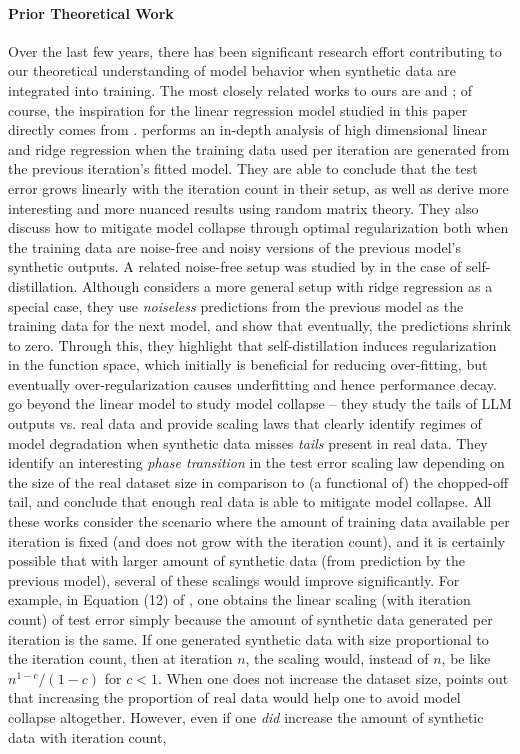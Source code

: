 \paragraph{Prior Theoretical Work} Over the last few years, there has been significant research effort contributing to our theoretical understanding of model behavior when synthetic data are integrated into training. The most closely related works to ours are \citet{dohmatob2024model} and \citet{dohmatob2024tale}; of course, the inspiration for the linear regression model studied in this paper directly comes from \citet{dohmatob2024model}. \citet{dohmatob2024model} performs an in-depth analysis of high dimensional linear and ridge regression when the training data used per iteration are generated from the previous iteration's fitted model. They are able to conclude that the test error grows linearly with the iteration count in their setup, as well as derive more interesting and more nuanced results using random matrix theory. They also discuss how to mitigate model collapse through optimal regularization both when the training data are noise-free and noisy versions of the previous model's synthetic outputs. A related noise-free setup was studied by \citet{mobahi2020self} in the case of self-distillation. Although \cite{mobahi2020self} considers a more general setup with ridge regression as a special case, they use \textit{noiseless} predictions from the previous model as the training data for the next model, and show that eventually, the predictions shrink to zero. Through this, they highlight that self-distillation induces regularization in the function space, which initially is beneficial for reducing over-fitting, but eventually over-regularization causes underfitting and hence performance decay. \cite{dohmatob2024tale} go beyond the linear model to study model collapse -- they study the tails of LLM outputs vs. real data and provide scaling laws that clearly identify regimes of model degradation when synthetic data misses \textit{tails} present in real data. They identify an interesting \textit{phase transition} in the test error scaling law depending on the size of the real dataset size in comparison to (a functional of) the chopped-off tail, and conclude that enough real data is able to mitigate model collapse. All these works consider the scenario where the amount of training data available per iteration is fixed (and does not grow with the iteration count), and it is certainly possible that with larger amount of synthetic data (from prediction by the previous model), several of these scalings would improve significantly. For example, in Equation (12) of \cite{dohmatob2024tale}, one obtains the linear scaling (with iteration count) of test error simply because the amount of synthetic data generated per iteration is the same. If one generated synthetic data with size proportional to the iteration count, then at iteration $n$, the scaling would, instead of $n$, be like $n^{1-c}/(1-c)$ for $c<1$. When one does not increase the dataset size, \cite{dohmatob2024tale} points out that increasing the proportion of real data would help one to avoid model collapse altogether. However, even if one \textit{did} increase the amount of synthetic data with iteration count, 